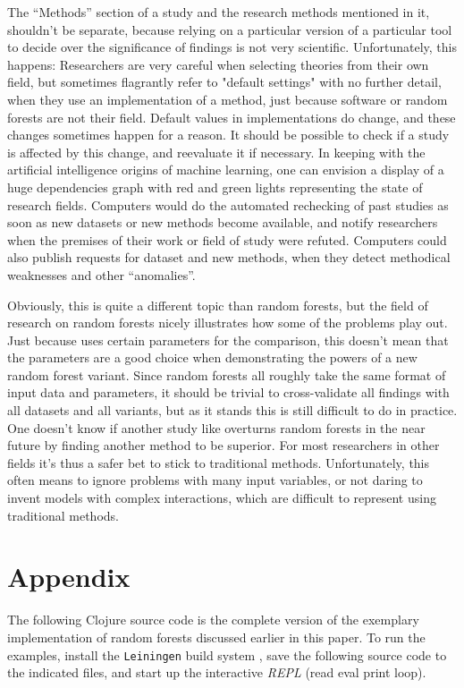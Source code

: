 \documentclass[a4paper,man,12pt,apacite,floatsintext,draftfirst]{apa6} %
\begin{document}
The “Methods” section of a study and the research methods mentioned in it,
shouldn't be separate, because relying on a particular version of a particular
tool to decide over the significance of findings is not very scientific.
Unfortunately, this happens:
Researchers are very careful when selecting theories from their own field,
but sometimes flagrantly refer to "default settings" with no further detail,
when they use an implementation of a method,
just because software or random forests are not their field.
Default values in implementations do change, and these changes sometimes
happen for a reason.
It should be possible to check if a study is affected by this change,
and reevaluate it if necessary.
In keeping with the artificial intelligence origins of machine learning,
one can envision a display of a huge dependencies graph with
red and green lights representing the state of research fields.
Computers would do the automated rechecking of past studies as soon as
new datasets or new methods become available, and notify researchers
when the premises of their work or field of study were refuted.
Computers could also publish requests for dataset and new methods,
when they detect methodical weaknesses and other “anomalies”.

Obviously, this is quite a different topic than random forests, but the
field of research on random forests nicely illustrates how some of the
problems play out.
Just because  uses certain parameters for the
comparison, this doesn't mean that the parameters are a good choice when
demonstrating the powers of a new random forest variant.
Since random forests all roughly take the same format of input data and
parameters, it should be trivial to cross-validate all findings with all
datasets and all variants, but as it stands this is still difficult to do in practice.
One doesn't know if another study like 
overturns random forests in the near future by finding another method to be
superior.
For most researchers in other fields it's thus a safer bet to stick to
traditional methods.
Unfortunately, this often means to ignore problems with many input variables,
or not daring to invent models with complex interactions,
which are difficult to represent using traditional methods.

\newpage
\section{Appendix}
The following Clojure source code is the complete version of the
exemplary implementation of random forests discussed earlier in this paper.
To run the examples, install the \texttt{Leiningen} build system
\cite{leiningen}, save the following source code to the indicated files,
and start up the interactive \emph{REPL} (read eval print loop).
\end{document}
